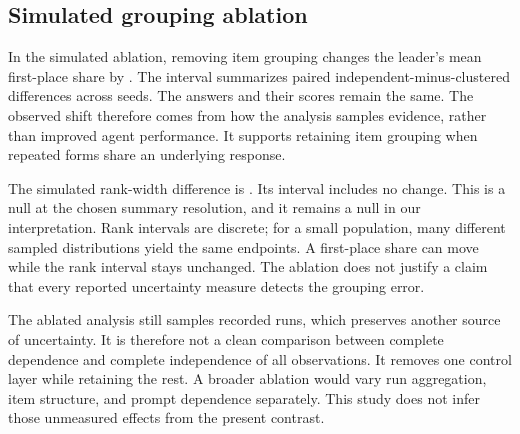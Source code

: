 \documentclass{article}
\begin{document}
\subsection{Simulated grouping ablation}

In the simulated ablation, removing item grouping changes the leader's mean first-place share by \AblationShare{}. The interval summarizes paired independent-minus-clustered differences across seeds. The answers and their scores remain the same. The observed shift therefore comes from how the analysis samples evidence, rather than improved agent performance. It supports retaining item grouping when repeated forms share an underlying response.\par
The simulated rank-width difference is \AblationWidth{}. Its interval includes no change. This is a null at the chosen summary resolution, and it remains a null in our interpretation. Rank intervals are discrete; for a small population, many different sampled distributions yield the same endpoints. A first-place share can move while the rank interval stays unchanged. The ablation does not justify a claim that every reported uncertainty measure detects the grouping error.\par
The ablated analysis still samples recorded runs, which preserves another source of uncertainty. It is therefore not a clean comparison between complete dependence and complete independence of all observations. It removes one control layer while retaining the rest. A broader ablation would vary run aggregation, item structure, and prompt dependence separately. This study does not infer those unmeasured effects from the present contrast.\par
\end{document}
